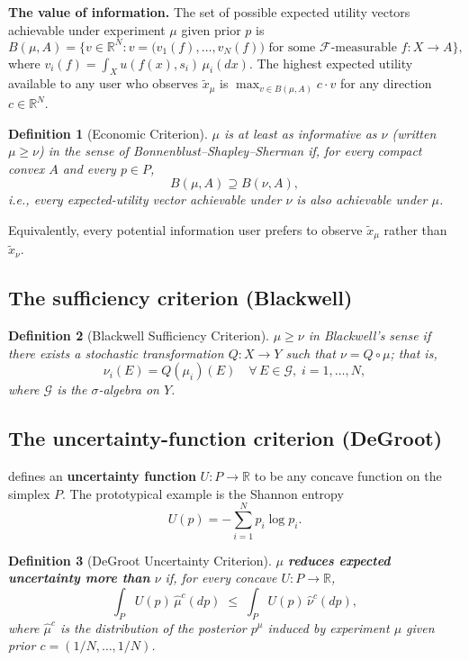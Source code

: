 \documentclass[12pt]{article}
\newtheorem{definition}{Definition}
\begin{document}
\medskip
\noindent\textbf{The value of information.}  The set of possible expected
utility vectors achievable under experiment $\mu$ given prior $p$ is
\[
B(\mu, A) = \bigl\{v \in \mathbb{R}^N :
  v = \bigl(v_1(f), \ldots, v_N(f)\bigr) \text{ for some }
  \mathscr{F}\text{-measurable } f: X \to A \bigr\},
\]
where $v_i(f) = \int_X u(f(x), s_i)\,\mu_i(dx)$.
The highest expected utility available to any user who observes $\tilde{x}_\mu$
is $\max_{v \in B(\mu,A)} c \cdot v$ for any direction $c \in \mathbb{R}^N$.

\begin{definition}[Economic Criterion]
$\mu$ is at least as informative as $\nu$ (written $\mu \geq \nu$) in the sense
of Bonnenblust--Shapley--Sherman if, for every compact convex $A$ and every
$p \in P$,
\[
B(\mu, A) \supseteq B(\nu, A),
\]
i.e., every expected-utility vector achievable under $\nu$ is also achievable
under $\mu$.
\end{definition}

Equivalently, every potential information user prefers to observe $\tilde{x}_\mu$
rather than $\tilde{x}_\nu$.

\subsection{The sufficiency criterion (Blackwell)}

\begin{definition}[Blackwell Sufficiency Criterion]
$\mu \geq \nu$ in Blackwell's sense if there exists a stochastic transformation
$Q: X \to Y$ such that $\nu = Q \circ \mu$; that is,
\[
\nu_i(E) = Q(\mu_i)(E)
\quad \forall\, E \in \mathscr{G},\; i = 1, \ldots, N,
\]
where $\mathscr{G}$ is the $\sigma$-algebra on $Y$.
\end{definition}

\subsection{The uncertainty-function criterion (DeGroot)}

\citet{degroot1962} defines an \textbf{uncertainty function} $U: P \to \mathbb{R}$
to be any concave function on the simplex $P$.  The prototypical example is the
Shannon entropy
\[
U(p) = -\sum_{i=1}^{N} p_i \log p_i.
\]

\begin{definition}[DeGroot Uncertainty Criterion]
$\mu$ \textbf{reduces expected uncertainty more than} $\nu$ if, for every concave
$U: P \to \mathbb{R}$,
\[
\int_P U(p)\,\hat\mu^c(dp)
\;\leq\;
\int_P U(p)\,\hat\nu^c(dp),
\]
where $\hat\mu^c$ is the distribution of the posterior $p^\mu$ induced by
experiment $\mu$ given prior $c = (1/N, \ldots, 1/N)$.
\end{definition}
\end{document}
